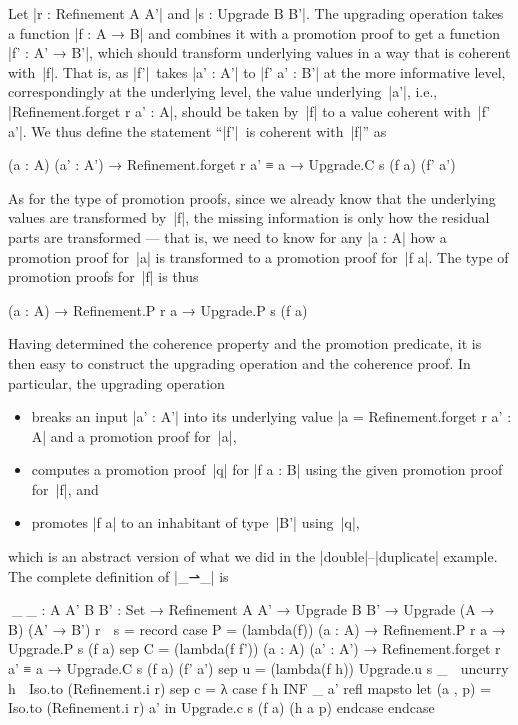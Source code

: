 Let |r : Refinement A A'| and |s : Upgrade B B'|.
The upgrading operation takes a function |f : A → B| and combines it with a promotion proof to get a function |f' : A' → B'|, which should transform underlying values in a way that is coherent with~|f|.
That is, as |f'|~takes |a' : A'| to |f' a' : B'| at the more informative level, correspondingly at the underlying level, the value underlying~|a'|, i.e., |Refinement.forget r a' : A|, should be taken by~|f| to a value coherent with~|f' a'|.
We thus define the statement ``|f'|~is coherent with~|f|'' as
\begin{code}
(a : A) (a' : A') → Refinement.forget r a' ≡ a → Upgrade.C s (f a) (f' a')
\end{code}
As for the type of promotion proofs, since we already know that the underlying values are transformed by~|f|, the missing information is only how the residual parts are transformed --- that is, we need to know for any |a : A| how a promotion proof for~|a| is transformed to a promotion proof for~|f a|.
The type of promotion proofs for~|f| is thus
\begin{code}
(a : A) → Refinement.P r a → Upgrade.P s (f a)
\end{code}
Having determined the coherence property and the promotion predicate, it is then easy to construct the upgrading operation and the coherence proof.
In particular, the upgrading operation
\begin{itemize}
\item breaks an input |a' : A'| into its underlying value |a = Refinement.forget r a' : A| and a promotion proof for~|a|,
\item computes a promotion proof~|q| for |f a : B| using the given promotion proof for~|f|, and
\item promotes |f a| to an inhabitant of type~|B'| using~|q|,
\end{itemize}
which is an abstract version of what we did in the |double|--|duplicate| example.
The complete definition of |_⇀_| is
\begin{code}
^^^_⇀_ :  {A A' B B' : Set} →
          Refinement A A' → Upgrade B B' → Upgrade (A → B) (A' → B')
r ⇀ s = record
  case   P  = (lambda(f)) (a : A) → Refinement.P r a → Upgrade.P s (f a)
  sep    C  = (lambda(f f'))  (a : A) (a' : A') →
                              Refinement.forget r a' ≡ a → Upgrade.C s (f a) (f' a')
  sep    u  = (lambda(f h)) Upgrade.u s _ ∘ uncurry h ∘ Iso.to (Refinement.i r)
  sep    c  = λ case f h INF _ a' refl mapsto  let  (a , p) = Iso.to (Refinement.i r) a'
                                               in   Upgrade.c s (f a) (h a p) endcase endcase
\end{code}

